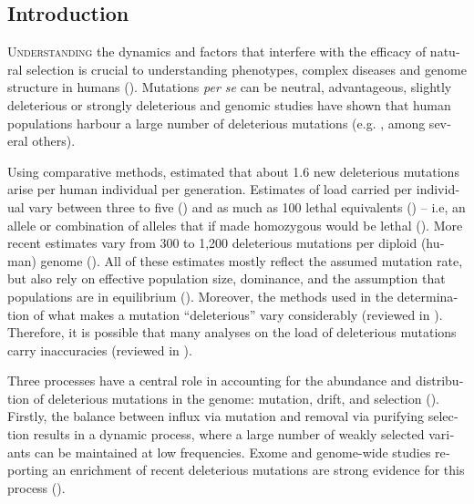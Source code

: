 \begin{refsection}
\begin{otherlanguage}{english}
%
\normalsize
\section{Introduction}
\lettrine[lines=3]{\color{airforceblue}U}{nderstanding} the dynamics and factors that interfere with the efficacy of natural selection is crucial to understanding phenotypes, complex diseases and genome structure in humans (\cite{Brandvain2016}). Mutations \emph{per se} can be neutral, advantageous, slightly deleterious or strongly deleterious and genomic studies have shown that human populations harbour a large number of deleterious mutations (e.g. \cite{Eyre-Walker1999,Kiezun2013}, among several others). 

Using comparative methods, \textcite{Eyre-Walker1999} estimated that about 1.6 new deleterious mutations arise per human individual per generation. %
Estimates of load carried per individual vary between three to five (\cite{Morton1956}) and as much as 100 lethal equivalents (\cite{Kondrashov1995}) -- i.e, an allele or combination of alleles that if made homozygous would be lethal (\cite{Lohmueller2008}). More recent estimates vary from 300 to 1,200 deleterious mutations per diploid (human) genome (\cite{Fay2011,Lohmueller2008,Sunyaev2001}). %
All of these estimates mostly reflect the assumed mutation rate, but also rely on effective population size, dominance, and the assumption that populations are in equilibrium (\cite{Brandvain2016}). Moreover, the methods used in the determination of what makes a mutation \enquote{deleterious} vary considerably (reviewed in \cite{Henn2015a}). Therefore, it is possible that many analyses on the load of deleterious mutations carry inaccuracies (reviewed in \cite{Brandvain2016}).

Three  processes have a central role in accounting for the abundance and distribution of deleterious mutations in the genome:  mutation, drift, and selection (\cite{Brandvain2016}). Firstly, the balance between influx via mutation and removal via purifying selection results in a dynamic process, where a large number of weakly selected variants can be maintained at low frequencies. Exome and genome-wide studies reporting an enrichment of recent deleterious mutations are strong evidence for this process (\cite{Casals2013,Fu2012,Tennessen2012,Kiezun2013}).


\end{otherlanguage}
\end{refsection}
